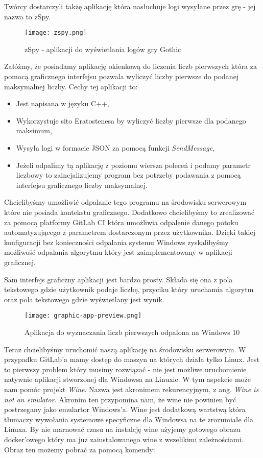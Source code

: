 Twórcy dostarczyli takżę aplikację która nasłuchuje logi wysyłane przez grę - jej nazwa to zSpy.
\begin{figure}[htbp]
  \centering
  \texttt{[image: zspy.png]}
  \caption{zSpy - aplikacji do wyświetlania logów gry Gothic}
  \label{fig:gh_pages}
\end{figure}
\par
Załóżmy, że posiadamy aplikację okienkową do liczenia liczb pierwszych która za pomocą graficznego interfejsu pozwala wyliczyć liczby pierwsze do podanej maksymalnej liczby. Cechy tej aplikacji to:
\begin{itemize}
  \item Jest napisana w języku C++,
  \item Wykorzystuje sito Eratostenesa by wyliczyć liczby pierwsze dla podanego maksimum,
  \item Wysyła logi w formacie JSON za pomocą funkcji \textit{SendMessage},
  \item Jeżeli odpalimy tą aplikację z poziomu wiersza poleceń i podamy parametr liczbowy to zaincjalizujemy program bez potrzeby podawania z pomocą interfejsu graficznego liczby maksymalnej.
\end{itemize}
Chcielibyśmy umożliwić odpalanie tego programu na środowisku serwerowym które nie posiada kontekstu graficznego. Dodatkowo chcielibyśmy to zrealizować za pomocą platformy GitLab CI która umożliwia odpalenie danego potoku automatyzującego z parametrem dostarczonym przez użytkownika. Dzięki takiej konfiguracji bez konieczności odpalania systemu Windows zyskalibyśmy możliwość odpalania algorytmu który jest zaimplementowany w aplikacji graficznej.
\par
Sam interfejs graficzny aplikacji jest bardzo prosty. Składa się ona z pola tekstowego gdzie użytkownik podaje liczbę, przyciku który uruchamia algorytm oraz pola tekstowego gdzie wyświetlany jest wynik.
\begin{figure}[htbp]
  \centering
  \texttt{[image: graphic-app-preview.png]}
  \caption{Aplikacja do wyznaczania liczb pierwszych odpalona na Windows 10}
  \label{fig:gh_pages}
\end{figure}
\par
Teraz chcielibyśmy uruchomić naszą aplikację na środowisku serwerowym. W przypadku GitLab'a mamy dostęp do maszyn na których działa tylko Linux. Jest to pierwszy problem który musimy rozwiązać - nie jest możliwe uruchomienie natywnie aplikacji stworzonej dla Windowsa na Linuxie. W tym aspekcie może nam pomóc projekt \textit{Wine}. Nazwa jest akronimem rekurencyjnym, z ang. \textit{Wine is not an emulator}. Akronim ten przypomina nam, że wine nie powinien być postrzegany jako emulartor Windows'a. Wine jest dodatkową wartstwą która tłumaczy wywołania systemowe specyficzne dla Windowsa na te zrozumiałe dla Linuxa. By nie marnować czasu na instalcję wine użyjemy gotowego obrazu docker'owego który ma już zainstalowanego wine z wszelikimi zależnościami. Obraz ten możemy pobrać za pomocą komendy:
